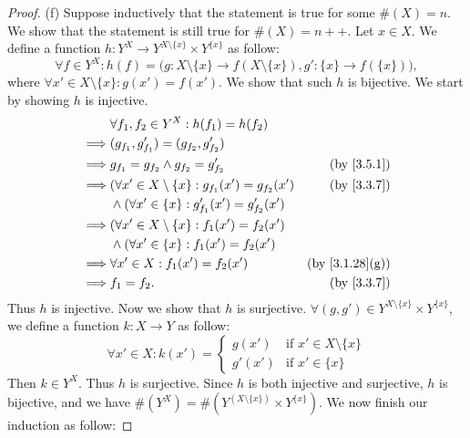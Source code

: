 \begin{proof}{(f)}
  Suppose inductively that the statement is true for some \(\#(X) = n\).
  We show that the statement is still true for \(\#(X) = n++\).
  Let \(x \in X\).
  We define a function \(h : Y^X \to Y^{X \setminus \{x\}} \times Y^{\{x\}}\) as follow:
  \[
    \forall f \in Y^X : h(f) = \bigg(g : X \setminus \{x\} \to f(X \setminus \{x\}), g' : \{x\} \to f(\{x\})\bigg),
  \]
  where \(\forall x' \in X \setminus \{x\} : g(x') = f(x')\).
  We show that such \(h\) is bijective.
  We start by showing \(h\) is injective.
  \begin{align*}
             & \forall f_1, f_2 \in Y^X : h(f_1) = h(f_2)                                                   \\
    \implies & (g_{f_1}, g_{f_1}') = (g_{f_2}, g_{f_2}')                                                    \\
    \implies & g_{f_1} = g_{f_2} \land g_{f_2} = g_{f_2}'                    & \text{(by \cref{3.5.1})}     \\
    \implies & (\forall x' \in X \setminus \{x\} : g_{f_1}(x') = g_{f_2}(x') & \text{(by \cref{3.3.7})}     \\
             & \land (\forall x' \in \{x\} : g_{f_1}'(x') = g_{f_2}'(x')                                    \\
    \implies & (\forall x' \in X \setminus \{x\} : f_1(x') = f_2(x')                                        \\
             & \land (\forall x' \in \{x\} : f_1(x') = f_2(x')                                              \\
    \implies & \forall x' \in X : f_1(x') = f_2(x')                          & \text{(by \cref{3.1.28}(g))} \\
    \implies & f_1 = f_2.                                                    & \text{(by \cref{3.3.7})}
  \end{align*}
  Thus \(h\) is injective.
  Now we show that \(h\) is surjective.
  \(\forall (g, g') \in Y^{X \setminus \{x\}} \times Y^{\{x\}}\), we define a function \(k : X \to Y\) as follow:
  \[
    \forall x' \in X : k(x') = \begin{cases}
      g(x')  & \text{if } x' \in X \setminus \{x\} \\
      g'(x') & \text{if } x' \in \{x\}
    \end{cases}
  \]
  Then \(k \in Y^X\).
  Thus \(h\) is surjective.
  Since \(h\) is both injective and surjective, \(h\) is bijective, and we have \(\#(Y^X) = \#(Y^{(X \setminus \{x\})} \times Y^{\{x\}})\).
  We now finish our induction as follow:

\end{proof}
